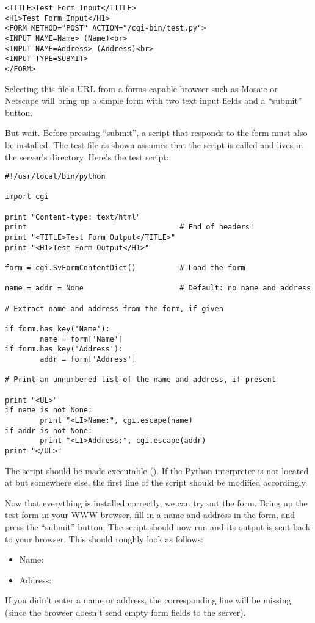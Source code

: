 \begin{verbatim}
<TITLE>Test Form Input</TITLE>
<H1>Test Form Input</H1>
<FORM METHOD="POST" ACTION="/cgi-bin/test.py">
<INPUT NAME=Name> (Name)<br>
<INPUT NAME=Address> (Address)<br>
<INPUT TYPE=SUBMIT>
</FORM>
\end{verbatim}

Selecting this file's URL from a forms-capable browser such as Mosaic
or Netscape will bring up a simple form with two text input fields and
a ``submit'' button.

But wait.  Before pressing ``submit'', a script that responds to the
form must also be installed.  The test file as shown assumes that the
script is called  and lives in the server's
 directory.  Here's the test script:

\begin{verbatim}
#!/usr/local/bin/python

import cgi

print "Content-type: text/html"
print                                   # End of headers!
print "<TITLE>Test Form Output</TITLE>"
print "<H1>Test Form Output</H1>"

form = cgi.SvFormContentDict()          # Load the form

name = addr = None                      # Default: no name and address

# Extract name and address from the form, if given

if form.has_key('Name'):
        name = form['Name']
if form.has_key('Address'):
        addr = form['Address']
        
# Print an unnumbered list of the name and address, if present

print "<UL>"
if name is not None:
        print "<LI>Name:", cgi.escape(name)
if addr is not None:
        print "<LI>Address:", cgi.escape(addr)
print "</UL>"
\end{verbatim}

The script should be made executable ().
If the Python interpreter is not located at
 but somewhere else, the first line of the
script should be modified accordingly.

Now that everything is installed correctly, we can try out the form.
Bring up the test form in your WWW browser, fill in a name and address
in the form, and press the ``submit'' button.  The script should now
run and its output is sent back to your browser.  This should roughly
look as follows:


\begin{itemize}
\item Name: 
\item Address: 
\end{itemize}

If you didn't enter a name or address, the corresponding line will be
missing (since the browser doesn't send empty form fields to the
server).
